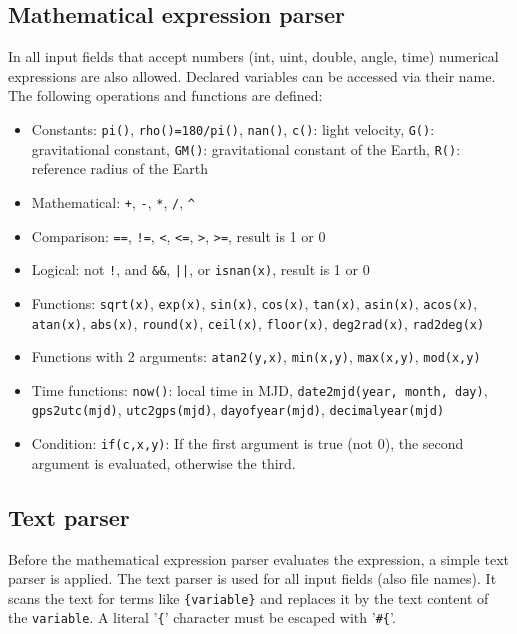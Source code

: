 
\subsection{Mathematical expression parser}\label{general.parser:expression}
In all input fields that accept numbers (int, uint, double, angle, time) numerical
expressions are also allowed. Declared variables can be accessed via their name. The following
operations and functions are defined:
\begin{itemize}
\item Constants:    \verb|pi()|, \verb|rho()=180/pi()|, \verb|nan()|, \verb|c()|: light velocity,
                    \verb|G()|: gravitational constant, \verb|GM()|: gravitational constant of the Earth, \verb|R()|: reference radius of the Earth
\item Mathematical: \verb|+|, \verb|-|, \verb|*|, \verb|/|, \verb|^|
\item Comparison:   \verb|==|, \verb|!=|, \verb|<|, \verb|<=|, \verb|>|, \verb|>=|, result is 1 or 0
\item Logical:      not \verb|!|, and \verb|&&|, \verb'||', or \verb|isnan(x)|, result is 1 or 0
\item Functions:    \verb|sqrt(x)|, \verb|exp(x)|,
                    \verb|sin(x)|,  \verb|cos(x)|, \verb|tan(x)|,
                    \verb|asin(x)|,  \verb|acos(x)|,  \verb|atan(x)|,
                    \verb|abs(x)|,  \verb|round(x)|,  \verb|ceil(x)|,  \verb|floor(x)|,
                    \verb|deg2rad(x)|, \verb|rad2deg(x)|
\item Functions with 2 arguments: \verb|atan2(y,x)|, \verb|min(x,y)|, \verb|max(x,y)|, \verb|mod(x,y)|
\item Time functions: \verb|now()|: local time in MJD, \verb|date2mjd(year, month, day)|, \verb|gps2utc(mjd)|, \verb|utc2gps(mjd)|, \verb|dayofyear(mjd)|, \verb|decimalyear(mjd)|
\item Condition: \verb|if(c,x,y)|: If the first argument is true (not 0), the second argument is evaluated, otherwise the third.
\end{itemize}


\subsection{Text parser}\label{general.parser:text}
Before the mathematical expression parser evaluates the expression, a simple text parser is applied.
The text parser is used for all input fields (also file names). It scans the text for terms like
\verb|{variable}| and replaces it by the text content of the \verb|variable|.
A literal '\verb|{|' character must be escaped with '\verb|#{|'.

